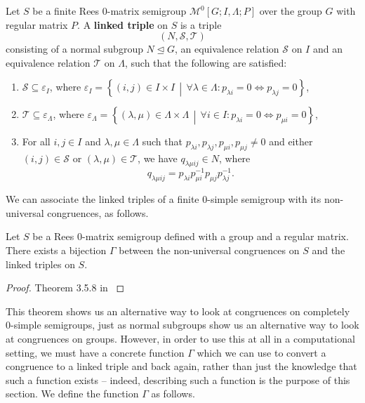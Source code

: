 \begin{definition}
  \label{def:linked-triple}
  Let $S$ be a finite Rees 0-matrix semigroup $\mathcal{M}^0[G;I,\Lambda;P]$
  over the group $G$ with regular matrix $P$.  A \textbf{linked triple} on $S$
  is a triple $$(N,\mathcal{S},\mathcal{T})$$ consisting of a normal subgroup
  $N \trianglelefteq G$, an equivalence relation $\mathcal{S}$ on $I$ and an
  equivalence relation $\mathcal{T}$ on $\Lambda$, such that the following are
  satisfied:
  \begin{enumerate}[\rm(i)]
  \item $\mathcal{S} \subseteq \varepsilon_I$, where $\varepsilon_I =
    \left\{(i,j) \in I \times I\, \middle|\, \forall \lambda \in \Lambda:
      p_{\lambda i}=0 \iff p_{\lambda j}=0 \right\}$,
  \item $\mathcal{T} \subseteq \varepsilon_\Lambda$, where $\varepsilon_\Lambda
    = \left\{(\lambda,\mu) \in \Lambda \times \Lambda\, \middle|\, \forall i \in
      I: p_{\lambda i}=0 \iff p_{\mu i}=0 \right\}$,
  \item For all $i,j \in I$ and $\lambda, \mu \in \Lambda$ such that
    $p_{\lambda i}, p_{\lambda j}, p_{\mu i}, p_{\mu j} \neq 0$ and either
    $(i,j) \in \mathcal{S}$ or $(\lambda,\mu) \in \mathcal{T}$, we have
    $q_{\lambda \mu i j} \in N$, where
    $$q_{\lambda \mu i j} = p_{\lambda i} p_{\mu i}^{-1} p_{\mu j} p_{\lambda
      j}^{-1}.$$
  \end{enumerate}
\end{definition}

We can associate the linked triples of a finite 0-simple semigroup with its
non-universal congruences, as follows.

\begin{theorem}
  \label{thm:linked-triple}
  Let $S$ be a Rees 0-matrix semigroup defined with a group and a regular
  matrix.  There exists a bijection $\Gamma$ between the non-universal
  congruences on $S$ and the linked triples on $S$.
  \begin{proof}
    Theorem 3.5.8 in \cite{howie}
  \end{proof}
\end{theorem}

This theorem shows us an alternative way to look at congruences on completely
0-simple semigroups, just as normal subgroups show us an alternative way to look
at congruences on groups.  However, in order to use this at all in a
computational setting, we must have a concrete function $\Gamma$ which we can
use to convert a congruence to a linked triple and back again, rather than just
the knowledge that such a function exists -- indeed, describing such a function
is the purpose of this section.  We define the function $\Gamma$ as follows.


